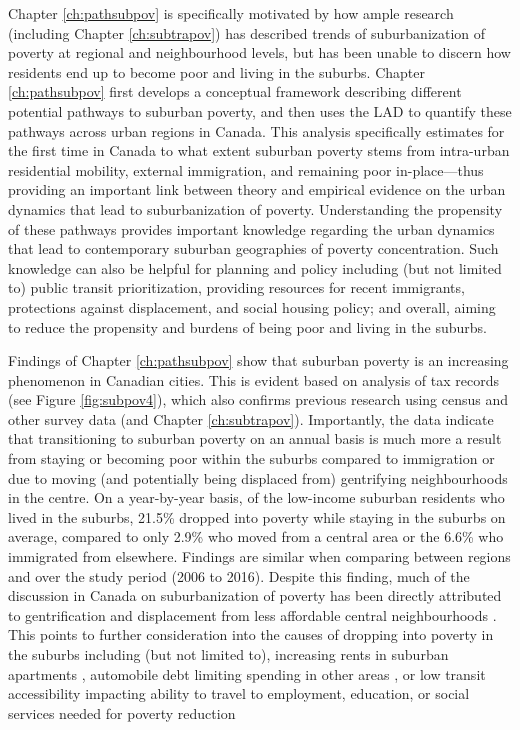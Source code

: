 Chapter \ref{ch:pathsubpov} is specifically motivated by how ample research (including Chapter \ref{ch:subtrapov}) has described trends of suburbanization of poverty at regional and neighbourhood levels, but has been unable to discern how residents end up to become poor and living in the suburbs. Chapter \ref{ch:pathsubpov} first develops a conceptual framework describing different potential pathways to suburban poverty, and then uses the LAD to quantify these pathways across urban regions in Canada. This analysis specifically estimates for the first time in Canada to what extent suburban poverty stems from intra-urban residential mobility, external immigration, and remaining poor in-place---thus providing an important link between theory and empirical evidence on the urban dynamics that lead to suburbanization of poverty. Understanding the propensity of these pathways provides important knowledge regarding the urban dynamics that lead to contemporary suburban geographies of poverty concentration. Such knowledge can also be helpful for planning and policy including (but not limited to) public transit prioritization, providing resources for recent immigrants, protections against displacement, and social housing policy; and overall, aiming to reduce the propensity and burdens of being poor and living in the suburbs.

Findings of Chapter \ref{ch:pathsubpov} show that suburban poverty is an increasing phenomenon in Canadian cities. This is evident based on analysis of tax records (see Figure \ref{fig:subpov4}), which also confirms previous research using census and other survey data \cite{ades_are_2012,breau_pulling_2018,grant_changing_2020} (and Chapter \ref{ch:subtrapov}). Importantly, the data indicate that transitioning to suburban poverty on an annual basis is much more a result from staying or becoming poor within the suburbs compared to immigration or due to moving (and potentially being displaced from) gentrifying neighbourhoods in the centre. On a year-by-year basis, of the low-income suburban residents who lived in the suburbs, 21.5\% dropped into poverty while staying in the suburbs on average, compared to only 2.9\% who moved from a central area or the 6.6\% who immigrated from elsewhere. Findings are similar when comparing between regions and over the study period (2006 to 2016). Despite this finding, much of the discussion in Canada on suburbanization of poverty has been directly attributed to gentrification and displacement from less affordable central neighbourhoods \cite{grant_changing_2020}. This points to further consideration into the causes of dropping into poverty in the suburbs including (but not limited to), increasing rents in suburban apartments \cite{august_gentrification_2018}, automobile debt limiting spending in other areas \cite{walks_driving_2018}, or low transit accessibility impacting ability to travel to employment, education, or social services needed for poverty reduction \cite{allen_planning_2020} 


